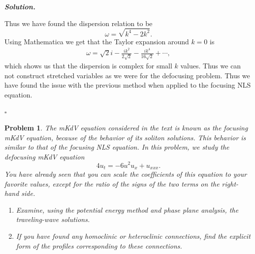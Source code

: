 \documentclass[12pt]{report}
\newtheorem{problem}{Problem}
\newenvironment{solution}[1][\it{Solution}]{\textbf{#1. } }{$\square$}
\begin{document}
\begin{solution}
\begin{enumerate}
        Thus we have found the dispersion relation to be
        \[
            \omega = \sqrt{k^4 - 2k^2}.
        \]
        Using Mathematica we get that the Taylor expansion around $k=0$ is
        \begin{align*}
            \omega = \sqrt{2}i - \frac{ik^2}{2\sqrt{2}} - \frac{ik^4}{16\sqrt{2}} + \cdots,
        \end{align*} 
        which shows us that the dispersion is complex for small $k$ values. Thus we can not construct stretched variables as we were for the defocusing problem. Thus we have found the issue with the previous method when applied to the focusing NLS equation.
    \end{enumerate}
\end{solution}

\newpage



\begin{problem}
    The mKdV equation considered in the text is known as the {\em focusing} mKdV equation, because of the behavior of its soliton solutions. This behavior is similar to that of the focusing NLS equation. In this problem, we study the {\em defocusing} mKdV equation
    \[
    4u_t=-6u^2 u_x+u_{xxx}.
    \]
    You have already seen that you can scale the coefficients of this equation to your favorite values, except for the ratio of the signs of the two terms on the right-hand side.

\begin{enumerate}

\item[{\bf a.}]    Examine, using the potential energy method and phase plane analysis, the traveling-wave solutions.

\item[{\bf b.}]  If you have found any homoclinic or heteroclinic connections, find the explicit form of the profiles corresponding to these connections.

\end{enumerate}
\end{problem}
\end{document}
